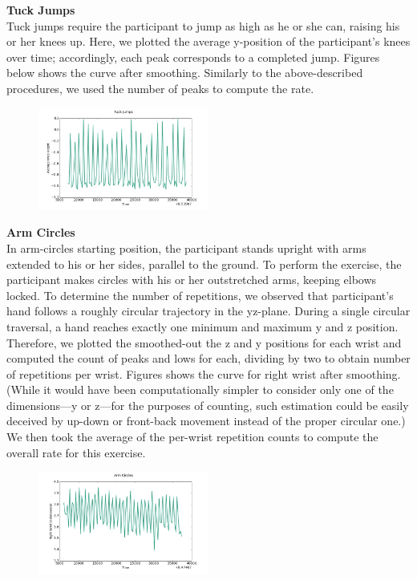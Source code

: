 \textbf{Tuck Jumps} \\
Tuck jumps require the participant to jump as high as he or she can, raising his or her knees up. Here, we plotted the average y-position of the participant's knees over time; accordingly, each peak corresponds to a completed jump. Figures below shows the curve after smoothing. Similarly to the above-described procedures, we used the number of peaks to compute the rate.
\begin{figure} [htp]
	\includegraphics[width=0.5\textwidth]{images/tj}
\end{figure}

\textbf{Arm Circles} \\
In arm-circles starting position, the participant stands upright with arms extended to his or her sides, parallel to the ground. To perform the exercise, the participant makes circles with his or her outstretched arms, keeping elbows locked. To determine the number of repetitions, we observed that participant’s hand follows a roughly circular trajectory in the yz-plane. During a single circular traversal, a hand reaches exactly one minimum and maximum y and z position. Therefore, we plotted the smoothed-out the z and y positions for each wrist and computed the count of peaks and lows for each, dividing by two to obtain number of repetitions per wrist. Figures shows the curve for right wrist after smoothing. (While it would have been computationally simpler to consider only one of the dimensions---y or z---for the purposes of counting, such estimation could be easily deceived by up-down or front-back movement instead of the proper circular one.) We then took the average of the per-wrist repetition counts to compute the overall rate for this exercise.
\begin{figure} [htp]
	\includegraphics[width=0.5\textwidth]{images/ac}
\end{figure}

